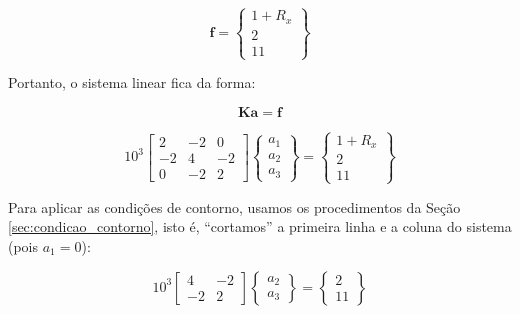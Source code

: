         \begin{equation*}
            \mathbf{f} = 
            \begin{Bmatrix}
                1 + R_x\\
                2\\
                11
            \end{Bmatrix}
        \end{equation*}

        Portanto, o sistema linear fica da forma:

        \begin{equation*}
            \mathbf{K} \mathbf{a} = \mathbf{f} 
        \end{equation*}

        \begin{equation*}
            10^3\begin{bmatrix}
                2 & -2 & 0\\
                -2 & 4 & -2\\
                0 & -2 & 2
            \end{bmatrix}
            \begin{Bmatrix}
                a_1\\
                a_2\\
                a_3
            \end{Bmatrix}
            =
            \begin{Bmatrix}
                1 + R_x\\
                2\\
                11
            \end{Bmatrix}
        \end{equation*}

        Para aplicar as condições de contorno, usamos os procedimentos da Seção \ref{sec:condicao_contorno}, isto é, ``cortamos'' a primeira linha e a coluna do sistema (pois $a_1=0$):

        \begin{equation*}
            10^3\begin{bmatrix}
                4 & -2\\
                -2 & 2
            \end{bmatrix}
            \begin{Bmatrix}
                a_2\\
                a_3
            \end{Bmatrix}
            =
            \begin{Bmatrix}
                2\\
                11
            \end{Bmatrix}
        \end{equation*}

